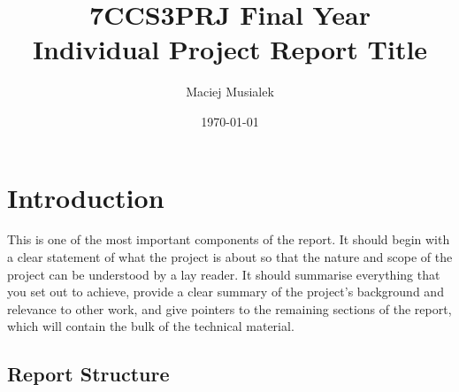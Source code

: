 \documentclass[11pt]{informatics-report}
\title{7CCS3PRJ Final Year\\\vspace{0.2cm}Individual Project Report Title}
\author{Maciej Musialek}
\date{\today}
\begin{document}
\createFrontMatter
\onehalfspacing
\tableofcontents
\doublespacing


\chapter{Introduction}
This is one of the most important components of the report. It should begin with a clear statement of what the project is about so that the nature and scope of the project can be understood by a lay reader. It should summarise everything that you set out to achieve, provide a clear summary of the project's background and relevance to other work, and give pointers to the remaining sections of the report, which will contain the bulk of the technical material.

\section{Report Structure}












\appendix



\end{document}
